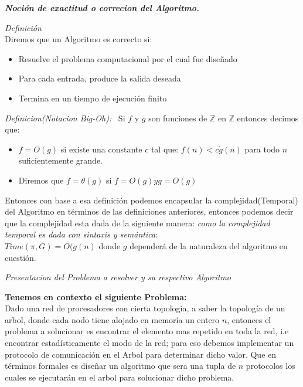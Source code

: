 \documentclass[11pt]{article}
\begin{document}
\textbf{\emph{Noción de exactitud o correcion del Algoritmo.}}

\emph{Definición}\\

Diremos que un Algoritmo es correcto si:
\begin{itemize}
       \item Resuelve el problema computacional por el cual fue diseñado
       \item Para cada entrada, produce la salida deseada
       \item Termina en un tiempo de ejecución finito

\end{itemize}
\emph{Definicion(Notacion Big-Oh):} \
Si $f$ y $g$ son funciones de $\mathbb{Z}$ en $\mathbb{Z}$ entonces decimos que:\
\begin{itemize}
    \item $f = O(g)$ si existe una constante $c$ tal que:
    $f(n) < c\dot g(n)$ para todo $n$ suficientemente grande.
    \item Diremos que $f = \theta(g)$ si $f = O(g) y g = O(g)$
\end{itemize}

Entonces con base a esa definición podemos encapsular la complejidad(Temporal)
del Algoritmo en términos de las definiciones anteriores,
entonces podemos decir que la complejidad esta dada de la siguiente manera:
 \emph{ como la complejidad temporal es dada con sintaxis y semántica}:\\

$ Time( \pi, G) = O(g(n) $ donde $ g $ dependerá de la naturaleza del algoritmo en cuestión.\\
\newpage
\begin{center}
    \begin{Large}
    \textit{Presentacion del Problema a resolver y su respectivo Algoritmo}
    \end{Large}
\end{center}
\textbf{ Tenemos en contexto el siguiente Problema:}
\\
Dado una red de procesadores con cierta topología, a saber la topología de un arbol,
donde cada nodo tiene alojado en memoría un entero $n$, entonces el problema a solucionar es encontrar el
elemento mas repetido en toda la red, i.e encontrar estadísticamente el modo de la red;
para eso debemos implementar un protocolo de comunicación en el Arbol para determinar dicho valor.
Que en términos formales es diseñar un algoritmo que sera una tupla de $n$ protocolos los cuales
se ejecutarán en el arbol para solucionar dicho problema.
\end{document}
